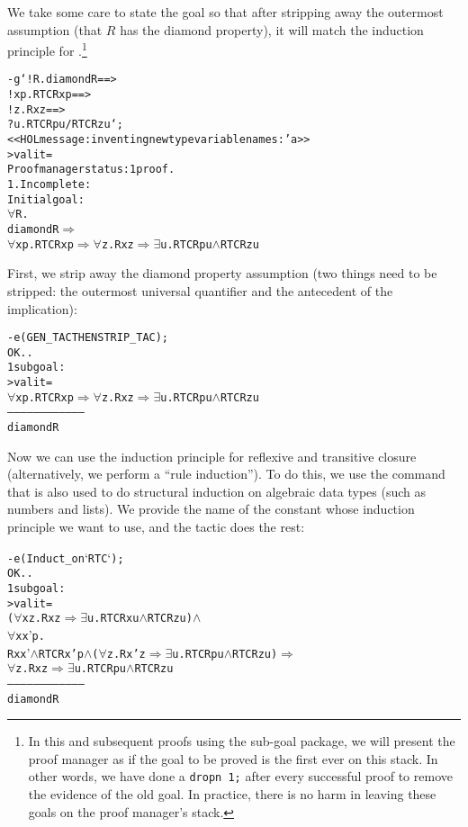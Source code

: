 We take some care to state the goal so that after stripping away the
outermost assumption (that $R$ has the diamond property), it will match the
induction principle for .\footnote{In this and subsequent
  proofs using the sub-goal package, we will present the proof manager
  as if the goal to be proved is the first ever on this stack.  In
  other words, we have done a \texttt{dropn 1;} after every successful
  proof to remove the evidence of the old goal.  In practice, there is
  no harm in leaving these goals on the proof manager's stack.}
\begin{session}
\begin{alltt}
- g `!R. diamond R ==>
         !x p. RTC R x p ==>
               !z. R x z ==>
                   ?u. RTC R p u /\bs RTC R z u`;
<<HOL message: inventing new type variable names: 'a>>
> val it =
    Proof manager status: 1 proof.
    1. Incomplete:
         Initial goal:
         \(\forall\)R.
           diamond R \(\Rightarrow\)
           \(\forall\)x p. RTC R x p \(\Rightarrow\) \(\forall\)z. R x z \(\Rightarrow\) \(\exists\)u. RTC R p u \(\land\) RTC R z u
\end{alltt}
\end{session}
First, we strip away the diamond property assumption (two things need to
be stripped: the outermost universal quantifier and the antecedent of
the implication):
\begin{session}
\begin{alltt}
- e (GEN_TAC THEN STRIP_TAC);
OK..
1 subgoal:
> val it =
    \(\forall\)x p. RTC R x p \(\Rightarrow\) \(\forall\)z. R x z \(\Rightarrow\) \(\exists\)u. RTC R p u \(\land\) RTC R z u
    ------------------------------------
      diamond R
\end{alltt}
\end{session}
Now we can use the induction principle for reflexive and transitive closure (alternatively, we perform a ``rule induction'').
To do this, we use the  command that is also used to do
structural induction on algebraic data types (such as numbers and
lists).
We provide the name of the constant whose induction principle we want
to use, and the tactic does the rest:
\begin{session}
\begin{alltt}
- e (Induct_on `RTC`);
OK..
1 subgoal:
> val it =
    (\(\forall\)x z. R x z \(\Rightarrow\) \(\exists\)u. RTC R x u \(\land\) RTC R z u) \(\land\)
    \(\forall\)x x' p.
      R x x' \(\land\) RTC R x' p \(\land\) (\(\forall\)z. R x' z \(\Rightarrow\) \(\exists\)u. RTC R p u \(\land\) RTC R z u) \(\Rightarrow\)
      \(\forall\)z. R x z \(\Rightarrow\) \(\exists\)u. RTC R p u \(\land\) RTC R z u
    ------------------------------------
      diamond R
\end{alltt}
\end{session}
